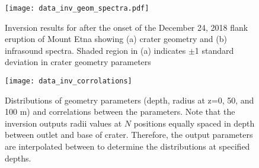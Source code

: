\documentclass[10pt]{article}
\begin{document}
\begin{figure}[h!]
\centering
\texttt{[image: data\_inv\_geom\_spectra.pdf]}
\caption{Inversion results for after the onset of the December 24, 2018 flank eruption of Mount Etna showing (a) crater geometry and (b) infrasound spectra. Shaded region in (a) indicates $\pm$1 standard deviation in crater geometry parameters}
\label{fig:data inversion}
\end{figure}

\begin{figure}[t!]
\centering
\texttt{[image: data\_inv\_corrolations]}
\caption{Distributions of geometry parameters (depth, radius at z=0, 50, and 100 m) and correlations between the parameters. Note that the inversion outputs radii values at $N$ positions equally spaced in depth between outlet and base of crater. Therefore, the output parameters are interpolated between to determine the distributions at specified depths. }
\label{fig:data corr}
\end{figure}

\newpage


\end{document}
